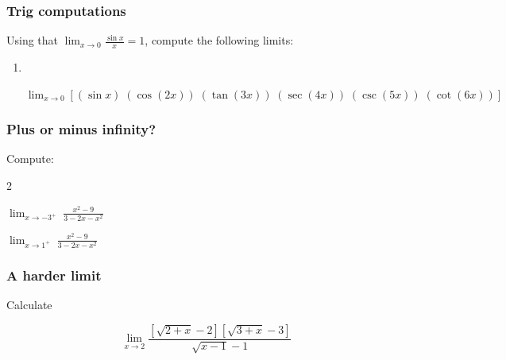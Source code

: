 \begin{frame}
	\frametitle{Trig computations}

	Using that $\displaystyle \lim_{x \to 0}\frac{\sin x}{x}= 1$, compute the following
	limits:

	\begin{enumerate}

		\item \
			\vspace{-.6cm}

			{\fontsize{13}{13}\selectfont $\displaystyle \lim_{x \to 0}\left[ (\sin x) \; (\cos (2x)) \; (\tan (3x)) \; (\sec (4x) ) \; (\csc (5x)) \; (\cot (6x)) \right]$ }
	\end{enumerate}
\end{frame}

\begin{frame}
	\frametitle{Plus or minus infinity?}

	Compute:
	\begin{enumerate}
	\end{enumerate}
\end{frame}

\begin{frame}
	\frametitle{A harder limit}

	Calculate

	\[
		\lim_{x \to 2}\frac{\left[\sqrt{2+x} -2\right] \left[ \sqrt{3+x} - 3 \right]}{\sqrt{x-1}
		- 1}
	\]
\end{frame}

